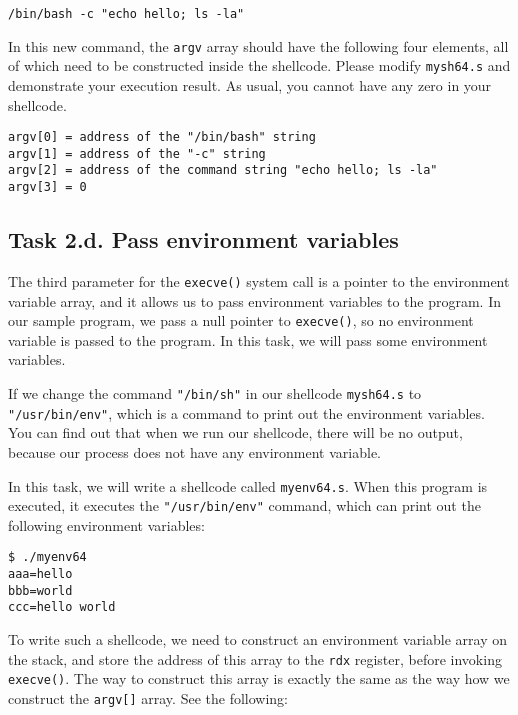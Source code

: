 \begin{lstlisting}
/bin/bash -c "echo hello; ls -la"
\end{lstlisting}

In this new command, the \texttt{argv} array should have 
the following four elements, all of which need to be 
constructed inside the shellcode. Please modify \texttt{mysh64.s} and 
demonstrate your execution result. As usual, you cannot have 
any zero in your shellcode.

\begin{lstlisting}
argv[0] = address of the "/bin/bash" string
argv[1] = address of the "-c" string
argv[2] = address of the command string "echo hello; ls -la"
argv[3] = 0
\end{lstlisting}
 

\subsection{Task 2.d. Pass environment variables}

The third parameter for the \texttt{execve()} system call
is a pointer to the environment variable array, and it allows 
us to pass environment variables to the program. In our 
sample program, we pass a null pointer to \texttt{execve()}, so
no environment variable is passed to the program. 
In this task, we will pass some environment variables. 

If we change the command \texttt{"/bin/sh"} in our shellcode
\texttt{mysh64.s} to \texttt{"/usr/bin/env"}, which is a command to print out the 
environment variables. You can find out that when we run
our shellcode, there will be no output, because our 
process does not have any environment variable.

In this task, we will write a shellcode called \texttt{myenv64.s}. When this 
program is executed, it executes the \texttt{"/usr/bin/env"} command, which
can print out the following environment variables: 

\begin{lstlisting}
$ ./myenv64
aaa=hello
bbb=world
ccc=hello world
\end{lstlisting}

To write such a shellcode, we need to construct an
environment variable array on the stack, 
and store the address of this array to the \texttt{rdx} register,  
before invoking \texttt{execve()}.  
The way to construct this array is exactly the same
as the way how we construct the \texttt{argv[]} array. 
See the following: 

